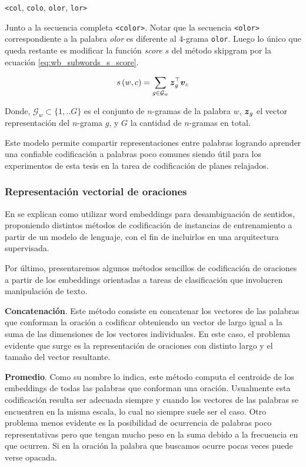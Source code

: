 \begin{center}
    \verb|<col|, \verb|colo|, \verb|olor|, \verb|lor>|
\end{center}

Junto a la secuencia completa \verb|<color>|. Notar que la secuencia
\verb|<olor>| correspondiente a la palabra \emph{olor} es diferente al $4$-grama
\verb|olor|. Luego lo único que queda restante es modificar la función
\emph{score} $s$ del método skipgram por la ecuación \ref{eq:wb_subwords_s_score}.

\begin{equation} \label{eq:wb_subwords_s_score}
    s\left(w, c\right) = \sum_{g \in \mathcal{G}_w} \boldsymbol{z}_g^{\top}\boldsymbol{v}_c
\end{equation}

Donde, $\mathcal{G}_w \subset \{1, .. G\}$ es el conjunto de $n$-gramas de la palabra $w$, $\boldsymbol{z}_g$ el vector representación del $n$-grama $g$, y $G$ la cantidad de $n$-gramas en total.

Este modelo permite compartir representaciones entre palabras logrando aprender
una confiable codificación a palabras poco comunes siendo útil para los
experimentos de esta tesis en la tarea de codificación de planes relajados.

\subsubsection{Representación vectorial de oraciones}

En \citep{Iacobacci-2016} se explican como utilizar word embeddings para
desambiguación de sentidos, proponiendo distintos métodos de codificación de
instancias de entrenamiento a partir de un modelo de lenguaje, con el fin
de incluirlos en una arquitectura supervisada.

Por último, presentaremos algunos métodos sencillos de codificación de oraciones a partir de los embeddings orientadas a tareas de clasificación que involucren manipulación de texto.

\textbf{Concatenación}. Este método consiste en concatenar los vectores de las
palabras que conforman la oración a codificar obteniendo un vector de largo
igual a la suma de las dimensiones de los vectores individuales. En este caso,
el problema evidente que surge es la representación de oraciones con distinto
largo y el tamaño del vector resultante.

\textbf{Promedio}. Como su nombre lo indica, este método computa el centroide de
los embeddings de todas las palabras que conforman una oración. Usualmente esta
codificación resulta ser adecuada siempre y cuando los vectores de las palabras
se encuentren en la misma escala, lo cual no siempre suele ser el caso. Otro
problema menos evidente es la posibilidad de ocurrencia de palabras poco
representativas pero que tengan mucho peso en la suma debido a la frecuencia en que ocurren. Si en la oración la palabra que buscamos ocurre pocas veces puede verse opacada.

